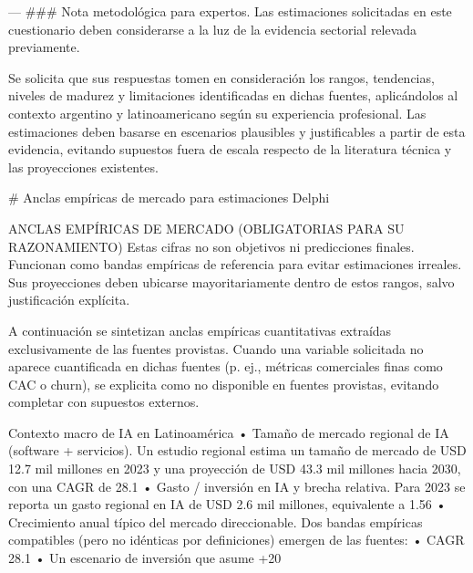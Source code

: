 \begin{APACode}
---
### Nota metodológica para expertos. Las estimaciones solicitadas en este cuestionario deben considerarse a la luz de la evidencia sectorial relevada previamente.

Se solicita que sus respuestas tomen en consideración los rangos, tendencias, niveles de madurez y limitaciones identificadas en dichas fuentes, aplicándolos al contexto argentino y latinoamericano según su experiencia profesional. Las estimaciones deben basarse en escenarios plausibles y justificables a partir de esta evidencia, evitando supuestos fuera de escala respecto de la literatura técnica y las proyecciones existentes.


# Anclas empíricas de mercado para estimaciones Delphi

ANCLAS EMPÍRICAS DE MERCADO (OBLIGATORIAS PARA SU RAZONAMIENTO)
Estas cifras no son objetivos ni predicciones finales. Funcionan como bandas empíricas de referencia para evitar estimaciones irreales. Sus proyecciones deben ubicarse mayoritariamente dentro de estos rangos, salvo justificación explícita.

A continuación se sintetizan anclas empíricas cuantitativas extraídas exclusivamente de las fuentes provistas. Cuando una variable solicitada no aparece cuantificada en dichas fuentes (p. ej., métricas comerciales finas como CAC o churn), se explicita como no disponible en fuentes provistas, evitando completar con supuestos externos.

Contexto macro de IA en Latinoamérica
	•	Tamaño de mercado regional de IA (software + servicios). Un estudio regional estima un tamaño de mercado de USD 12.7 mil millones en 2023 y una proyección de USD 43.3 mil millones hacia 2030, con una CAGR de 28.1%
	•	Gasto / inversión en IA y brecha relativa. Para 2023 se reporta un gasto regional en IA de USD 2.6 mil millones, equivalente a 1.56%
	•	Crecimiento anual típico del mercado direccionable. Dos bandas empíricas compatibles (pero no idénticas por definiciones) emergen de las fuentes:
	•	CAGR 28.1%
	•	Un escenario de inversión que asume +20%


\end{APACode}
